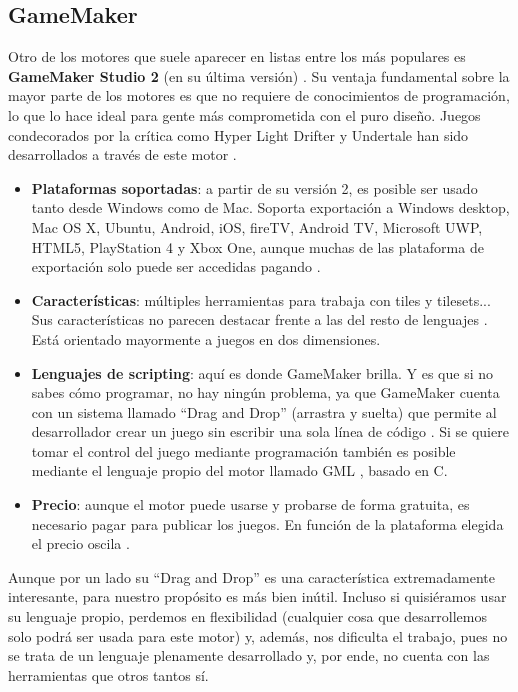 \subsection{GameMaker}
Otro de los motores que suele aparecer en listas entre los más populares es \textbf{GameMaker Studio 2} (en su última versión) \cite{topengines}. Su ventaja fundamental sobre la mayor parte de los motores es que no requiere de conocimientos de programación, lo que lo hace ideal para gente más comprometida con el puro diseño. Juegos condecorados por la crítica como Hyper Light Drifter y Undertale han sido desarrollados a través de este motor \cite{gamesgamemaker}.

\begin{itemize}
\item \textbf{Plataformas soportadas}: a partir de su versión 2, es posible ser usado tanto desde Windows como de Mac. Soporta exportación a Windows desktop, Mac OS X, Ubuntu, Android, iOS, fireTV, Android TV, Microsoft UWP, HTML5, PlayStation 4 y Xbox One, aunque muchas de las plataforma de exportación solo puede ser accedidas pagando \cite{getgamemaker}.
\item \textbf{Características}: múltiples herramientas para trabaja con tiles y tilesets... Sus características no parecen destacar frente a las del resto de lenguajes \cite{featuresgamemaker}. Está orientado mayormente a juegos en dos dimensiones. 
\item \textbf{Lenguajes de scripting}: aquí es donde GameMaker brilla. Y es que si no sabes cómo programar, no hay ningún problema, ya que GameMaker cuenta con un sistema llamado ``Drag and Drop'' (arrastra y suelta) que permite al desarrollador crear un juego sin escribir una sola línea de código \cite{featuresgamemaker}. Si se quiere tomar el control del juego mediante programación también es posible mediante el lenguaje propio del motor llamado GML \cite{languagegamemaker}, basado en C.
\item \textbf{Precio}: aunque el motor puede usarse y probarse de forma gratuita, es necesario pagar para publicar los juegos. En función de la plataforma elegida el precio oscila \cite{getgamemaker}.
\end{itemize}

Aunque por un lado su ``Drag and Drop'' es una característica extremadamente interesante, para nuestro propósito es más bien inútil. Incluso si quisiéramos usar su lenguaje propio, perdemos en flexibilidad (cualquier cosa que desarrollemos solo podrá ser usada para este motor) y, además, nos dificulta el trabajo, pues no se trata de un lenguaje plenamente desarrollado y, por ende, no cuenta con las herramientas que otros tantos sí.

